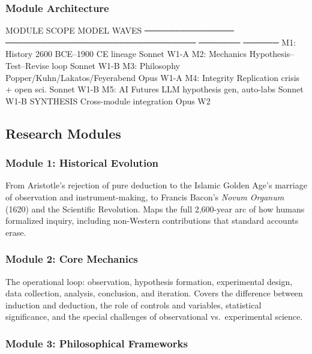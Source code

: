 \documentclass[11pt,letterpaper]{article}
\begin{document}
\subsubsection{Module Architecture}

\begin{asciibox}
  MODULE          SCOPE                             MODEL    WAVES
  ─────────────── ────────────────────────────────  ───────  ──────
  M1: History     2600 BCE–1900 CE lineage          Sonnet   W1-A
  M2: Mechanics   Hypothesis–Test–Revise loop       Sonnet   W1-B
  M3: Philosophy  Popper/Kuhn/Lakatos/Feyerabend    Opus     W1-A
  M4: Integrity   Replication crisis + open sci.    Sonnet   W1-B
  M5: AI Futures  LLM hypothesis gen, auto-labs     Sonnet   W1-B
  SYNTHESIS       Cross-module integration          Opus     W2
\end{asciibox}

\subsection{Research Modules}

\subsubsection{Module 1: Historical Evolution}

From Aristotle's rejection of pure deduction to the Islamic Golden Age's marriage of observation and instrument-making, to Francis Bacon's \emph{Novum Organum} (1620) and the Scientific Revolution. Maps the full 2,600-year arc of how humans formalized inquiry, including non-Western contributions that standard accounts erase.

\subsubsection{Module 2: Core Mechanics}

The operational loop: observation, hypothesis formation, experimental design, data collection, analysis, conclusion, and iteration. Covers the difference between induction and deduction, the role of controls and variables, statistical significance, and the special challenges of observational vs.\ experimental science.

\subsubsection{Module 3: Philosophical Frameworks}
\end{document}
